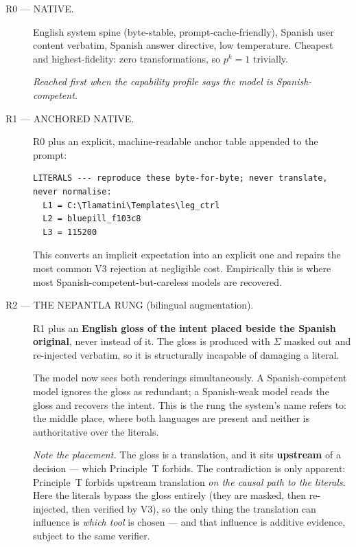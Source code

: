 \begin{description}

\item[R0 --- NATIVE.] English system spine (byte-stable,
prompt-cache-friendly), Spanish user content verbatim, Spanish answer directive,
low temperature. Cheapest and highest-fidelity: zero transformations, so
$p^{k} = 1$ trivially.

\emph{Reached first when the capability profile says the model is
Spanish-competent.}

\item[R1 --- ANCHORED NATIVE.] R0 plus an explicit, machine-readable anchor
table appended to the prompt:

\begin{lstlisting}[caption={The R1 anchor table, appended verbatim to the prompt.},label={lst:anchor-table}]
LITERALS --- reproduce these byte-for-byte; never translate, never normalise:
  L1 = C:\Tlamatini\Templates\leg_ctrl
  L2 = bluepill_f103c8
  L3 = 115200
\end{lstlisting}

This converts an implicit expectation into an explicit one and repairs the most
common V3 rejection at negligible cost. Empirically this is where most
Spanish-competent-but-careless models are recovered.

\item[R2 --- THE NEPANTLA RUNG (bilingual augmentation).] R1 plus an
\textbf{English gloss of the intent placed beside the Spanish original}, never
instead of it. The gloss is produced with $\Sigma$ masked out and re-injected
verbatim, so it is structurally incapable of damaging a literal.

The model now sees both renderings simultaneously. A Spanish-competent model
ignores the gloss as redundant; a Spanish-weak model reads the gloss and
recovers the intent. This is the rung the system's name refers to: the middle
place, where both languages are present and neither is authoritative over the
literals.

\emph{Note the placement.} The gloss is a translation, and it sits
\textbf{upstream} of a decision --- which Principle~T forbids. The contradiction
is only apparent: Principle~T forbids upstream translation \emph{on the causal
path to the literals}. Here the literals bypass the gloss entirely (they are
masked, then re-injected, then verified by V3), so the only thing the
translation can influence is \emph{which tool} is chosen --- and that influence
is additive evidence, subject to the same verifier.


\end{description}
